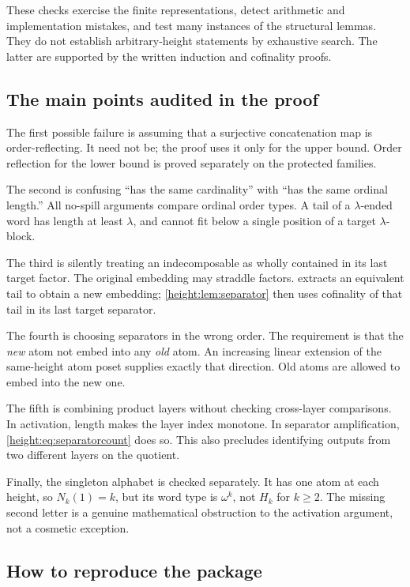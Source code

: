 \documentclass[11pt,a4paper]{article}
\numberwithin{equation}{section}
\theoremstyle{definition}
\theoremstyle{remark}
\begin{document}
These checks exercise the finite representations, detect arithmetic and
implementation mistakes, and test many instances of the structural
lemmas. They do not establish arbitrary-height statements by exhaustive
search. The latter are supported by the written induction and cofinality
proofs.

\subsection{The main points audited in the proof}

The first possible failure is assuming that a surjective concatenation
map is order-reflecting. It need not be; the proof uses it only for the
upper bound. Order reflection for the lower bound is proved separately
on the protected families.

The second is confusing ``has the same cardinality'' with ``has the same
ordinal length.'' All no-spill arguments compare ordinal order types.
A tail of a $\lambda$-ended word has length at least $\lambda$, and cannot
fit below a single position of a target $\lambda$-block.

The third is silently treating an indecomposable as wholly contained in
its last target factor. The original embedding may straddle factors.
 extracts an equivalent tail to obtain a new
embedding; \cref{height:lem:separator} then uses cofinality of that tail in its
last target separator.

The fourth is choosing separators in the wrong order. The requirement
is that the \emph{new} atom not embed into any \emph{old} atom. An
increasing linear extension of the same-height atom poset supplies
exactly that direction. Old atoms are allowed to embed into the new one.

The fifth is combining product layers without checking cross-layer
comparisons. In activation, length makes the layer index monotone. In
separator amplification, \cref{height:eq:separatorcount} does so. This also
precludes identifying outputs from two different layers on the quotient.

Finally, the singleton alphabet is checked separately. It has one atom
at each height, so $N_k(1)=k$, but its word type is $\omega^k$, not
$H_k$ for $k\ge2$. The missing second letter is a genuine mathematical
obstruction to the activation argument, not a cosmetic exception.

\subsection{How to reproduce the package}
\end{document}
